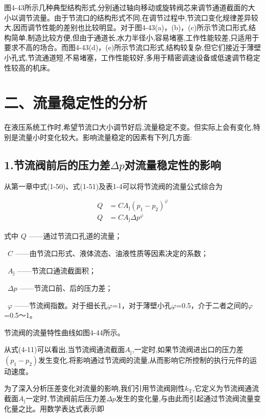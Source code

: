 图4-43所示几种典型结构形式,分别通过轴向移动或旋转阀芯来调节通道截面的大小以调节流量。由于节流口的结构形式不同,在调节过程中,节流口变化规律差异较大,因而调节性能的差别也比较明显。对于图4-43(a)，(b)，(c)所示节流口形式,结构简单,制造比较方便,但由于通道长,水力半径小,容易堵塞,工作性能较差,只适用于要求不高的场合。而图4-43(d)，(e)所示节流口形式,结构较复杂,但它们接近于薄壁小孔式,节流通道短,不易堵塞，工作性能较好,多用于精密调速设备或低速调节稳定性较高的机床。

\section*{二、流量稳定性的分析}

在液压系统工作时,希望节流口大小调节好后,流量稳定不变。但实际上会有变化,特别是流量小时变化较大。影响流量稳定的因素有下列几方面:

\subsection*{1.节流阀前后的压力差$\Delta p$对流量稳定性的影响}

从第一章中式(1-50)、式(1-51)及表1-4可以将节流阀的流量公式综合为

\begin{equation}
\begin{split}
Q & =CA_\text{j}(p_1 - p_2)^\varphi\\
Q & =CA_\text{j}\Delta p^\varphi
\end{split}
\end{equation}

\noindent
式中 $Q$ ——通过节流口孔道的流量；

\ $C$ ——由节流口形式、液体流态、油液性质等因素决定的系数；

\ $A_\text{j}$ ——节流口通流截面积；

\ $\Delta p$ ——节流口前、后的压力差；

\ $\varphi$ ——节流阀指数。对于细长孔$\varphi$=1，对于薄壁小孔$\varphi$=0.5，介于二者之间的$\varphi$=0.5～1。

节流阀的流量特性曲线如图4-44所示。

从式(4-11)可以看出,当节流阀通流截面$A_\text{j}$,一定时,如果节流阀进出口的压力差$(p_\text{1} - p_\text{2})$发生变化,将影响通过节流阀的流量,从而影响它所控制的执行元件的运动速度。

为了深入分析压差变化对流量的影响,我们引用节流阀刚性$k_\text{T}$,它定义为节流阀通流截面$A_\text{j}$一定时,节流阀前后压力差$\Delta p$发生的变化量,与由此而引起通过节流阀流量变化量之比。用数学表达式表示即

